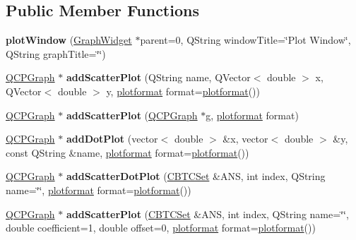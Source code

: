 \subsection*{Public Member Functions}
\begin{DoxyCompactItemize}
\item 
\mbox{\label{classplot_window_a2d18548d53b26ad9c2890a81f86c984f}} 
{\bfseries plot\+Window} (\hyperlink{class_graph_widget}{Graph\+Widget} $\ast$parent=0, Q\+String window\+Title=\char`\"{}Plot Window\char`\"{}, Q\+String graph\+Title=\char`\"{}\char`\"{})
\item 
\mbox{\label{classplot_window_ad34133a14e7b54719730bf332d90ee49}} 
\hyperlink{class_q_c_p_graph}{Q\+C\+P\+Graph} $\ast$ {\bfseries add\+Scatter\+Plot} (Q\+String name, Q\+Vector$<$ double $>$ x, Q\+Vector$<$ double $>$ y, \hyperlink{structplotformat}{plotformat} format=\hyperlink{structplotformat}{plotformat}())
\item 
\mbox{\label{classplot_window_ad579aa87b21c36626b6f687aabbefc64}} 
\hyperlink{class_q_c_p_graph}{Q\+C\+P\+Graph} $\ast$ {\bfseries add\+Scatter\+Plot} (\hyperlink{class_q_c_p_graph}{Q\+C\+P\+Graph} $\ast$g, \hyperlink{structplotformat}{plotformat} format)
\item 
\mbox{\label{classplot_window_ace822896c90f6a11f21fa1cf79c28779}} 
\hyperlink{class_q_c_p_graph}{Q\+C\+P\+Graph} $\ast$ {\bfseries add\+Dot\+Plot} (vector$<$ double $>$ \&x, vector$<$ double $>$ \&y, const Q\+String \&name, \hyperlink{structplotformat}{plotformat} format=\hyperlink{structplotformat}{plotformat}())
\item 
\mbox{\label{classplot_window_a9bbf3bc5134d8ee22eea006e05b3c01e}} 
\hyperlink{class_q_c_p_graph}{Q\+C\+P\+Graph} $\ast$ {\bfseries add\+Scatter\+Dot\+Plot} (\hyperlink{class_c_b_t_c_set}{C\+B\+T\+C\+Set} \&A\+NS, int index, Q\+String name=\char`\"{}\char`\"{}, \hyperlink{structplotformat}{plotformat} format=\hyperlink{structplotformat}{plotformat}())
\item 
\mbox{\label{classplot_window_a386e6a43374ce73eab8ca946c6a0ec3e}} 
\hyperlink{class_q_c_p_graph}{Q\+C\+P\+Graph} $\ast$ {\bfseries add\+Scatter\+Plot} (\hyperlink{class_c_b_t_c_set}{C\+B\+T\+C\+Set} \&A\+NS, int index, Q\+String name=\char`\"{}\char`\"{}, double coefficient=1, double offset=0, \hyperlink{structplotformat}{plotformat} format=\hyperlink{structplotformat}{plotformat}())

\end{DoxyCompactItemize}
